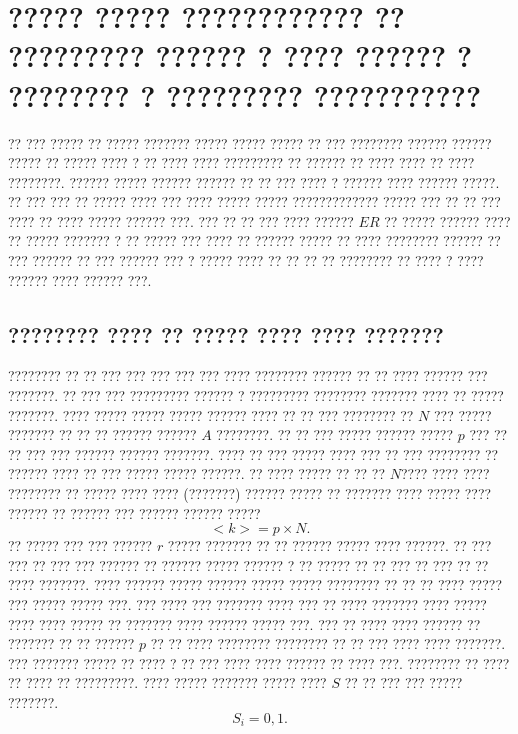 \chapter{????? ????? ???????????? ?? ????????? ?????? ? ???? ?????? ? ???????? ?  ????????? ???????????}
?? ??? ????? ?? ????? ??????? ????? ????? ????? ?? ??? ???????? ?????? ?????? ????? ?? ????? ???? ? ?? ???? ???? ????????? ?? ?????? ?? ???? ???? ?? ???? ????????. ?????? ????? ?????? ?????? ?? ?? ??? ???? ? ?????? ???? ?????? ?????. ?? ??? ??? ?? ????? ???? ??? ???? ????? ????? ????????????? ????? ??? ?? ?? ??? ???? ?? ???? ?????  ?????? ???. ??? ?? ?? ??? ???? ?????? $ER$  ?? ????? ?????? ????  ?? ????? ???????  ? ?? ????? ??? ???? ?? ?????? ????? ?? ???? ???????? ?????? ?? ??? ??????  ?? ??? ?????? ??? ? ????? ???? ?? ?? ??  ?? ???????? ?? ???? ? ???? ??????  ???? ?????? ???.

\section{???????? ???? ?? ????? ???? ???? ???????}
???????? ?? ?? ??? ??? ??? ??? ??? ???? ???????? ?????? ?? ?? ???? ?????? ??? ???????. ?? ??? ??? ????????? ?????? ? ????????? ???????? ??????? ???? ?? ????? ???????. ???? ?????  ????? ?????  ?????? ???? ??  ?? ???  ???????? ??  $N$ ??? ????? ??????? ??  ?? ?? ?????? ?????? $A$ ????????. ?? ?? ??? ????? ?????? ????? $p$  ??? ?? ?? ??? ??? ?????? ?????? ???????. ???? ?? ??? ????? ???? ??? ?? ??? ???????? ?? ?????? ???? ?? ??? ????? ????? ??????. ?? ???? ????? ?? ?? ?? $N$???? ????  ???? ???????? ?? ????? ???? ???? (???????) ??????  ????? ?? ??????? ???? ????? ???? ??????  ?? ?????? ??? ?????? ?????? ?????
\begin{equation}
{<k> = p\times N}.
\end{equation}
?? ????? ???  ??? ?????? $r$ ????? ??????? ?? ?? ?????? ????? ???? ??????. ?? ??? ??? ?? ??? ??? ?????? ?? ?????? ????? ?????? ? ?? ????? ?? ?? ??? ?? ??? ?? ?? ???? ???????. ???? ?????? ????? ?????? ????? ????? ???????? ?? ?? ?? ???? ????? ??? ????? ????? ???. ??? ???? ??? ??????? ???? ??? ?? ???? ??????? ???? ????? ???? ???? ????? ?? ??????? ???? ?????? ????? ???. 
??? ?? ???? ???? ?????? ?? ??????? ?? ?? ?????? $p$ ?? ?? ???? ???????? ???????? ?? ?? ??? ???? ???? ???????. ??? ??????? ????? ?? ???? ? ?? ??? ???? ???? ?????? ?? ???? ???. ???????? ?? ???? ?? ???? ?? ?????????. ???? ????? ??????? ????? ???? $S$ ?? ?? ??? ??? ????? ???????. 
\begin{equation}
{S_{i} = 0 , 1} .
\end{equation}

